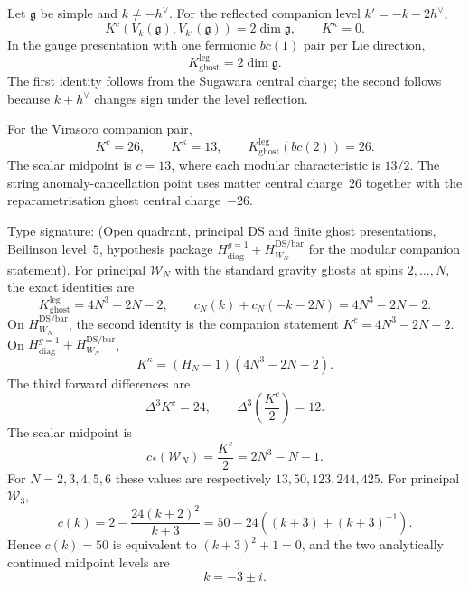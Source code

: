\begin{corollary}
\label{cor:K-affine-KM}
Let $\mathfrak g$ be simple and $k\ne-h^\vee$.  For the reflected
companion level $k'=-k-2h^\vee$,
\[
K^c(V_k(\mathfrak g),V_{k'}(\mathfrak g))=2\dim\mathfrak g,
\qquad K^\kappa=0.
\]
In the gauge presentation with one fermionic $bc(1)$ pair per Lie
direction,
\[
K_{\mathrm{ghost}}^{\mathrm{leg}}=2\dim\mathfrak g.
\]
The first identity follows from the Sugawara central charge; the second
follows because $k+h^\vee$ changes sign under the level reflection.
\end{corollary}

\begin{corollary}[Virasoro]
\label{cor:K-virasoro}
For the Virasoro companion pair,
\[
 K^c=26,\qquad K^\kappa=13,
 \qquad K_{\mathrm{ghost}}^{\mathrm{leg}}(bc(2))=26.
\]
The scalar midpoint is $c=13$, where each modular characteristic is
$13/2$.  The string anomaly-cancellation point uses matter central
charge~$26$ together with the reparametrisation ghost central
charge~$-26$.
\end{corollary}

\begin{corollary}
\label{cor:K-WN-cubic}
Type signature: \textup{(}Open quadrant, principal DS and finite ghost
presentations, Beilinson level~$5$, hypothesis package
$H_{\mathrm{diag}}^{g=1}+H_{W_N}^{\mathrm{DS/bar}}$ for the modular
companion statement\textup{)}.
For principal $\mathcal W_N$ with the standard gravity ghosts at spins
$2,\ldots,N$, the exact identities are
\[
 K_{\mathrm{ghost}}^{\mathrm{leg}}
 =4N^3-2N-2,
\qquad
c_N(k)+c_N(-k-2N)=4N^3-2N-2.
\]
On $H_{W_N}^{\mathrm{DS/bar}}$, the second identity is the companion
statement $K^c=4N^3-2N-2$.  On
$H_{\mathrm{diag}}^{g=1}+H_{W_N}^{\mathrm{DS/bar}}$,
\[
 K^\kappa=(H_N-1)(4N^3-2N-2).
\]
The third forward differences are
\[
\Delta^3K^c=24,
\qquad
\Delta^3\left(\frac{K^c}{2}\right)=12.
\]
The scalar midpoint is
\[
c_*(\mathcal W_N)=\frac{K^c}{2}=2N^3-N-1.
\]
For $N=2,3,4,5,6$ these values are respectively
$13,50,123,244,425$.  For principal $\mathcal W_3$,
\[
c(k)=2-\frac{24(k+2)^2}{k+3}
=50-24\left((k+3)+(k+3)^{-1}\right).
\]
Hence $c(k)=50$ is equivalent to $(k+3)^2+1=0$, and the two
analytically continued midpoint levels are
\[
k=-3\pm i.
\]
\end{corollary}

